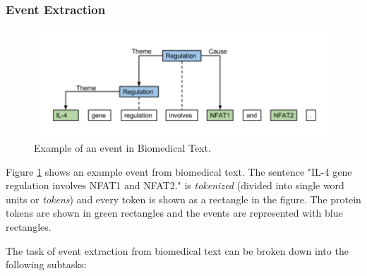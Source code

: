 \subsubsection{Event Extraction}

\begin{figure}
\centering
\includegraphics[scale=0.4]{figures/EventExample.png}
\caption{Example of an event in Biomedical Text.}\label{fig:eventExample}
\end{figure}

Figure \ref{fig:eventExample} shows an example event from biomedical text. The sentence "IL-4 gene regulation involves NFAT1 and NFAT2." is \textit{tokenized} (divided into single word units or \textit{tokens}) and every token is shown as a rectangle in the figure. The protein tokens are shown in green rectangles and the events are represented with blue rectangles.

The task of event extraction from biomedical text can be broken down into the following subtasks:

